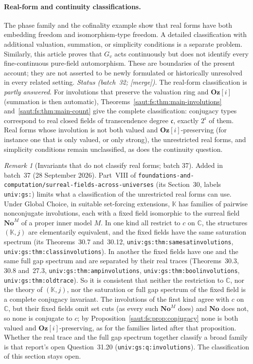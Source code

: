 \documentclass[11pt]{article}
\theoremstyle{definition}
\theoremstyle{remark}
\newtheorem{remark}[theorem]{Remark}
\newcommand{\No}{\mathbf{No}}
\newcommand{\C}{\mathbb C}
\newcommand{\K}{\mathbb K}
\newcommand{\repo}[1]{\nolinkurl{#1}}%
\newcommand{\lbl}[1]{\nolinkurl{#1}}%
\newcommand{\Oz}{\mathbf{Oz}}
\newcommand{\cc}{\mathfrak c}
\newcommand{\mergetag}{\textup{[merge]}}
\numberwithin{equation}{section}
\begin{document}
\paragraph{Real-form and continuity classifications.}
The phase family and the cofinality example show that real forms have both
embedding freedom and isomorphism-type freedom. A detailed classification
with additional valuation, summation, or simplicity conditions is a separate
problem. Similarly, this article proves that $G_v$ acts continuously but
does not identify every fine-continuous pure-field automorphism. These are
boundaries of the present account; they are not asserted to be newly
formulated or historically unresolved in every related setting.
\emph{Status (batch~32; \mergetag).} The real-form classification is
\emph{partly answered}. For involutions that preserve the valuation ring and
$\Oz[i]$ (summation is then automatic), Theorems~\ref{saut:fs:thm:main-involutions}
and~\ref{saut:fs:thm:main-count} give the complete classification: conjugacy types
correspond to real closed fields of transcendence degree $\cc$, exactly $2^{\cc}$ of
them. Real forms whose involution is not both valued and $\Oz[i]$-preserving (for
instance one that is only valued, or only strong), the unrestricted real forms, and
simplicity conditions remain unclassified, as does the continuity question.

\begin{remark}[Invariants that do not classify real forms; batch 37]\label{saut:rem:univspectra}
Added in batch~37 (28 September 2026). Part~VIII of
\repo{foundations-and-computation/surreal-fields-across-universes} (its
Section~30, labels \lbl{univ:gs:}) limits what a classification of the
unrestricted real forms can use. Under Global Choice, in suitable set-forcing
extensions, $\K$ has families of pairwise nonconjugate involutions, each with a
fixed field isomorphic to the surreal field $\No^M$ of a proper inner model $M$. In one
kind all restrict to $c$ on $\C$, the structures $(\K,j)$ are elementarily
equivalent, and the fixed fields have the same saturation spectrum (its
Theorems~30.7 and~30.12,
\lbl{univ:gs:thm:samesatinvolutions}, \lbl{univ:gs:thm:classinvolutions}). In
another the fixed fields have one and the same full gap spectrum and are separated
by their real traces (Theorems~30.3, 30.8 and~27.3,
\lbl{univ:gs:thm:ampinvolutions}, \lbl{univ:gs:thm:boolinvolutions},
\lbl{univ:gs:thm:oldtrace}). So it is consistent that neither the restriction to
$\C$, nor the theory of $(\K,j)$, nor the saturation or full gap spectrum of the
fixed field is a complete conjugacy invariant. The involutions of the first kind
agree with $c$ on $\C$, but their fixed fields omit set cuts (as every such $\No^M$
does) and $\No$ does not, so none is conjugate to $c$; by
Proposition~\ref{saut:fs:prop:conjugacy} none is both
valued and $\Oz[i]$-preserving, as for the families listed after that
proposition. Whether the real trace and the full gap spectrum together classify a
broad family is that report's open Question~31.20
(\lbl{univ:gs:q:involutions}). The classification of this section stays open.
\end{remark}
\end{document}
